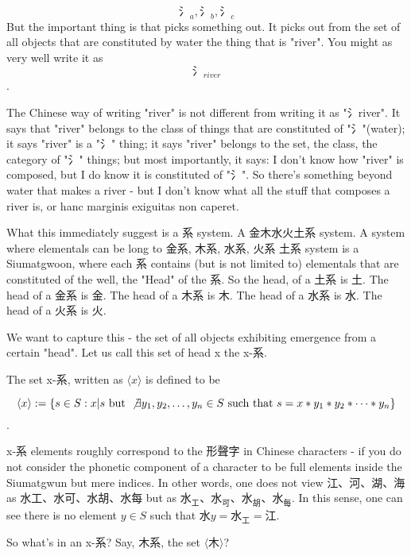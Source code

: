 $$\text{氵}_{a},\text{氵}_b,\text{氵}_c$$
But the important thing is that picks something out. It picks out from the set of all objects that are constituted by water the thing that is "river". You might as very well write it as $$\text{氵}_{river}$$. 

The Chinese way of writing "river" is not different from writing it as "氵river". It says that "river" belongs to the class of things that are constituted of "氵"(water); it says "river" is a "氵" thing; it says "river" belongs to the set, the class, the category of "氵" things; but most importantly, it says: I don't know how "river" is composed, but I do know it is constituted of "氵". So there's something beyond water that makes a river - but I don't know what all the stuff that composes a river is, or hanc marginis exiguitas non caperet.

What this immediately suggest is a 系 system. A 金木水火土系 system. A system where elementals can be long to 金系, 木系, 水系, 火系 土系 system is a Siumatgwoon, where each 系 contains (but is not limited to) elementals that are constituted of the well, the "Head" of the 系. So the head, of a 土系 is 土. The head of a 金系 is 金. The head of a 木系 is 木. The head of a 水系 is 水. The head of a 火系 is 火. 

We want to capture this - the set of all objects exhibiting emergence from a certain "head". Let us call this set of head x the x-系. 



\begin{definition}\label{def:hai-elements}
    The set x-系, written as $\langle x \rangle$ is defined to be 
    
    $$\langle x \rangle := \{ s\in S: x|s \text{ but } \not \exists y_1, y_2,\ldots, y_n \in S \text{ such that } s=x*y_1*y_2*\cdots*y_n\}$$. 
    \end{definition}

    x-系 elements roughly correspond to the 形聲字 in Chinese characters - if you do not consider the phonetic component of a character to be full elements inside the Siumatgwun but mere indices. In other words, one does not view 江、河、湖、海 as 水工、水可、水胡、水每 but as $\text{水}_\text{工}、\text{水}_\text{可}、\text{水}_\text{胡}、\text{水}_\text{每}$. In this sense, one can see there is no element $y \in S$ such that $\text{水}y=\text{水}_\text{工}=\text{江}$.

        
 So what's in an x-系? Say, 木系, the set $\langle \text{木} \rangle$?

